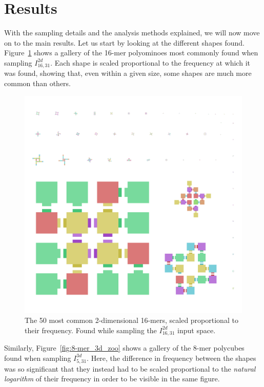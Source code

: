 

\section{Results}

With the sampling details and the analysis methods explained, we will now move on to the main results. Let us start by looking at the different shapes found. Figure~\ref{fig:16-mer_2d_zoo} shows a gallery of the 16-mer polyominoes most commonly found when sampling \(I_{16,31}^{2d}\). Each shape is scaled proportional to the frequency at which it was found, showing that, even within a given size, some shapes are much more common than others.

\begin{figure}[h]
    \centering
    \includegraphics[width=\textwidth]{figures/16-mers_2d.png}
    \caption{The 50 most common 2-dimensional 16-mers, scaled proportional to their frequency. Found while sampling the \(I_{16,31}^{2d}\) input space.}
    \label{fig:16-mer_2d_zoo}
\end{figure}

Similarly, Figure~\ref{fig:8-mer_3d_zoo} shows a gallery of the 8-mer polycubes found when sampling \(I_{5,31}^{3d}\). Here, the difference in frequency between the shapes was so significant that they instead had to be scaled proportional to the \emph{natural logarithm} of their frequency in order to be visible in the same figure. 

